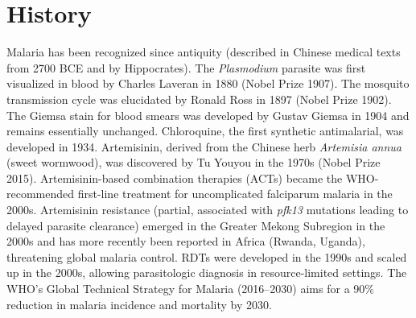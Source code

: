 \section*{History}
Malaria has been recognized since antiquity (described in Chinese medical texts from 2700 BCE and by Hippocrates). The \textit{Plasmodium} parasite was first visualized in blood by Charles Laveran in 1880 (Nobel Prize 1907). The mosquito transmission cycle was elucidated by Ronald Ross in 1897 (Nobel Prize 1902). The Giemsa stain for blood smears was developed by Gustav Giemsa in 1904 and remains essentially unchanged. Chloroquine, the first synthetic antimalarial, was developed in 1934. Artemisinin, derived from the Chinese herb \textit{Artemisia annua} (sweet wormwood), was discovered by Tu Youyou in the 1970s (Nobel Prize 2015). Artemisinin-based combination therapies (ACTs) became the WHO-recommended first-line treatment for uncomplicated falciparum malaria in the 2000s. Artemisinin resistance (partial, associated with \textit{pfk13} mutations leading to delayed parasite clearance) emerged in the Greater Mekong Subregion in the 2000s and has more recently been reported in Africa (Rwanda, Uganda), threatening global malaria control. RDTs were developed in the 1990s and scaled up in the 2000s, allowing parasitologic diagnosis in resource-limited settings. The WHO's Global Technical Strategy for Malaria (2016--2030) aims for a 90\% reduction in malaria incidence and mortality by 2030.

